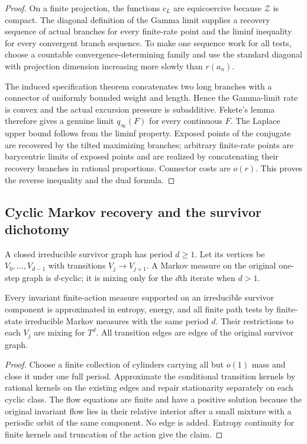 \begin{proof}
On a finite projection, the functions $c_L$ are equicoercive because
$\mathcal Z$ is compact.  The diagonal definition of the Gamma limit supplies
a recovery sequence of actual branches for every finite-rate point and the
liminf inequality for every convergent branch sequence.  To make one sequence
work for all tests, choose a countable convergence-determining family and use
the standard diagonal with projection dimension increasing more slowly than
$r(a_n)$.

The induced specification theorem concatenates two long branches with a
connector of uniformly bounded weight and length.  Hence the Gamma-limit rate
is convex and the actual excursion pressure is subadditive.  Fekete's lemma
therefore gives a genuine limit $q_\infty(F)$ for every continuous $F$.
The Laplace upper bound follows from the liminf property.  Exposed points of
the conjugate are recovered by the tilted maximizing branches; arbitrary
finite-rate points are barycentric limits of exposed points and are realized
by concatenating their recovery branches in rational proportions.  Connector
costs are $o(r)$.  This proves the reverse inequality and the dual formula.
\end{proof}

\subsection{Cyclic Markov recovery and the survivor dichotomy}

A closed irreducible survivor graph has period $d\ge1$.  Let its vertices be
$V_0,\ldots,V_{d-1}$ with transitions $V_j\to V_{j+1}$.  A Markov measure on
the original one-step graph is $d$-cyclic; it is mixing only for the $d$th
iterate when $d>1$.

\begin{lemma}
\label{lem:r7-a3-markov}
Every invariant finite-action measure supported on an irreducible survivor
component is approximated in entropy, energy, and all finite path tests by
finite-state irreducible Markov measures with the same period $d$.  Their
restrictions to each $V_j$ are mixing for $T^d$.  All transition edges are
edges of the original survivor graph.
\end{lemma}

\begin{proof}
Choose a finite collection of cylinders carrying all but $o(1)$ mass and close
it under one full period.  Approximate the conditional transition kernels by
rational kernels on the existing edges and repair stationarity separately on
each cyclic class.  The flow equations are finite and have a positive solution
because the original invariant flow lies in their relative interior after a
small mixture with a periodic orbit of the same component.  No edge is added.
Entropy continuity for finite kernels and truncation of the action give the
claim.
\end{proof}

